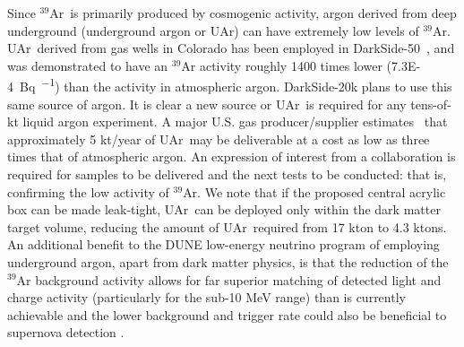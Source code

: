 \documentclass[a4paper,11pt]{article}
\newcommand{\artn}{$^{39}$Ar}
\newcommand{\uar}{UAr}
\begin{document}
Since \artn~is primarily produced by cosmogenic activity, argon derived from deep underground (underground argon or \uar) can have extremely low levels of \artn. \uar~derived from gas wells in Colorado has been employed in DarkSide-50~\cite{DarkSide-50}, and was demonstrated to have an $^{39}$Ar activity roughly 1400 times lower (\SI{7.3E-4}{\becquerel\per\kgar}) than the activity in atmospheric argon. DarkSide-20k plans to use this same source of argon. It is clear a new source or \uar~is required for any tens-of-kt liquid argon experiment. A major U.S. gas producer/supplier estimates~\cite{privateconv:gaspro} that approximately 5 kt/year of \uar~may be deliverable at a cost as low as three times that of atmospheric argon. An expression of interest from a collaboration is required for samples to be delivered and the next tests to be conducted: that is, confirming the low activity of $^{39}$Ar. We note that if the proposed central acrylic box can be made leak-tight, \uar~can be deployed only within the dark matter target volume, reducing the amount of \uar~required from 17 kton to 4.3 ktons. An additional benefit to the DUNE low-energy neutrino program of employing underground argon, apart from dark matter physics, is that the reduction of the $^{39}$Ar background activity allows for far superior matching of detected light and charge activity (particularly for the sub-10 MeV range) than is currently achievable and the lower background and trigger rate could also  be beneficial to supernova detection \cite{scholberg2018low}.
\end{document}
